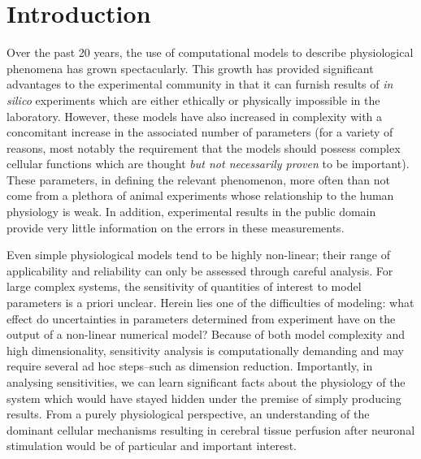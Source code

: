 \section{Introduction}\label{sec:intro}
Over the past 20 years, the use of computational models to describe physiological phenomena has grown spectacularly. This growth has provided significant advantages to the experimental community in that it can furnish results of \textit{in silico} experiments which are either ethically or physically impossible in the laboratory. However, these models have also increased in complexity with a concomitant increase in the associated number of parameters (for a variety of reasons, most notably the requirement that the models should possess complex cellular functions which are thought \textit{but not necessarily proven} to be important). These parameters, in defining the relevant phenomenon, more often than not come from a plethora of animal experiments whose relationship to the human physiology is weak.  In addition, experimental results in the public domain provide very little information on the errors in these measurements. 

Even simple physiological models tend to be  highly non-linear; their range of applicability and reliability can only be assessed  through careful analysis. For large complex systems, the sensitivity of quantities of interest to model parameters is a priori unclear. Herein lies one of the difficulties of modeling: what effect do uncertainties in parameters determined from experiment have on the output of a non-linear numerical model? Because of both model complexity and high dimensionality, sensitivity analysis is  computationally demanding and may require several ad hoc steps--such as dimension reduction. Importantly, in analysing  sensitivities, we can learn significant facts about the physiology of the system which would have stayed hidden under the premise of simply producing results. 
From a purely physiological perspective, an understanding of the dominant cellular mechanisms resulting in cerebral tissue perfusion after neuronal stimulation would be of particular and important interest. 

